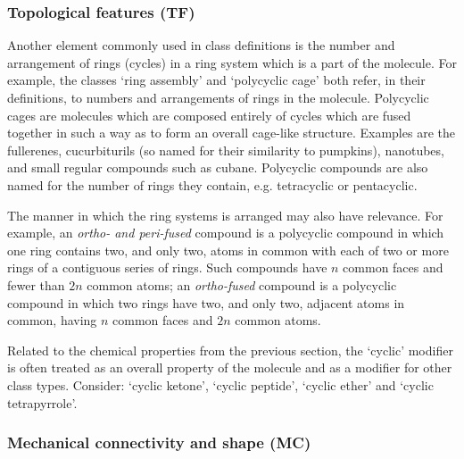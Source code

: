 \documentclass[10pt]{bmc_article}
\newenvironment{bmcformat}{\baselineskip20pt\sloppy\setboolean{publ}{false}}{\baselineskip20pt\sloppy}
\begin{document}
\begin{bmcformat}
\subsubsection*{Topological features (TF)}

Another element commonly used in class definitions is the number and arrangement of rings (cycles) in a ring system which is a part of the molecule. For example, the classes `ring assembly' and `polycyclic cage' both refer, in their definitions, to numbers and arrangements of rings in the molecule. Polycyclic cages are molecules which are composed entirely of cycles which are fused together in such a way as to form an overall cage-like structure.  Examples are the fullerenes, cucurbiturils (so named for their similarity to pumpkins), nanotubes, and small regular compounds such as cubane.  Polycyclic compounds are also named for the number  of rings they contain, e.g. tetracyclic or  pentacyclic. 

The manner in which the ring systems is arranged may also have relevance. For example, an \textit{ortho- and peri-fused} compound is a polycyclic compound in which one ring contains two, and only two, atoms in common with each of two or more rings of a contiguous series of rings. Such compounds have $n$ common faces and fewer than $2n$ common atoms; an \textit{ortho-fused} compound is a polycyclic compound in which two rings have two, and only two, adjacent atoms in common, having $n$ common faces and $2n$ common atoms.

Related to the chemical properties from the previous section, the `cyclic' modifier is often treated as an overall property of the molecule and as a modifier for other class types. Consider: `cyclic ketone', `cyclic peptide', %
 `cyclic ether' and `cyclic tetrapyrrole'.

\subsubsection*{Mechanical connectivity and shape (MC)}


\end{bmcformat}
\end{document}
